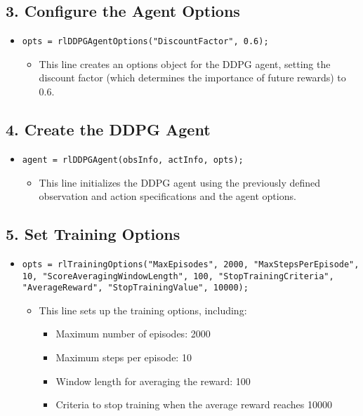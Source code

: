 \documentclass[12pt]{article}
\begin{document}
\subsection*{3. Configure the Agent Options}

\begin{itemize}
    \item \texttt{opts = rlDDPGAgentOptions("DiscountFactor", 0.6);}
    \begin{itemize}
        \item This line creates an options object for the DDPG agent, setting the discount factor (which determines the importance of future rewards) to 0.6.
    \end{itemize}
\end{itemize}

\subsection*{4. Create the DDPG Agent}

\begin{itemize}
    \item \texttt{agent = rlDDPGAgent(obsInfo, actInfo, opts);}
    \begin{itemize}
        \item This line initializes the DDPG agent using the previously defined observation and action specifications and the agent options.
    \end{itemize}
\end{itemize}

\subsection*{5. Set Training Options}

\begin{itemize}
    \item \texttt{opts = rlTrainingOptions("MaxEpisodes", 2000, "MaxStepsPerEpisode", 10, "ScoreAveragingWindowLength", 100, "StopTrainingCriteria", "AverageReward", "StopTrainingValue", 10000);}
    \begin{itemize}
        \item This line sets up the training options, including:
        \begin{itemize}
            \item Maximum number of episodes: 2000
            \item Maximum steps per episode: 10
            \item Window length for averaging the reward: 100
            \item Criteria to stop training when the average reward reaches 10000
        \end{itemize}
    \end{itemize}
\end{itemize}
\end{document}
